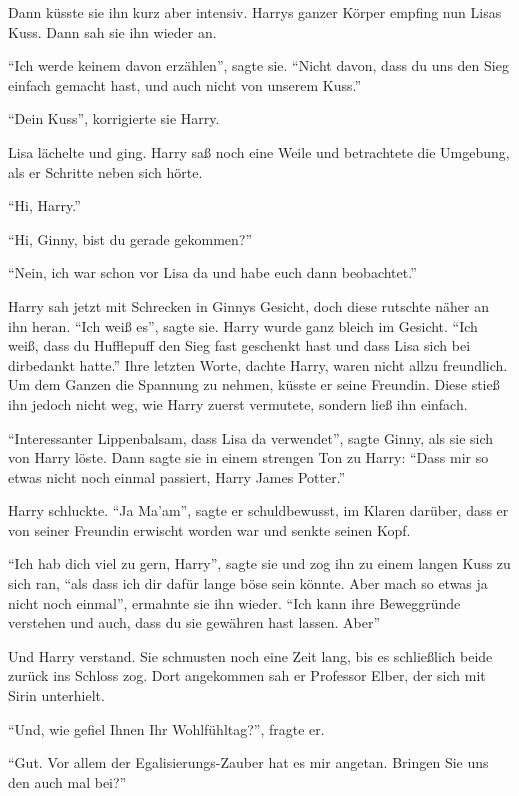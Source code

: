 Dann küsste sie ihn kurz aber intensiv. Harrys ganzer Körper empfing nun Lisas Kuss. Dann sah sie ihn wieder an.

\enquote{Ich werde keinem davon erzählen}, sagte sie. \enquote{Nicht davon, dass du uns den Sieg einfach gemacht hast, und auch nicht von unserem Kuss.}

\enquote{Dein Kuss}, korrigierte sie Harry.

Lisa lächelte und ging. Harry saß noch eine Weile und betrachtete die Umgebung, als er Schritte neben sich hörte.

\enquote{Hi, Harry.}

\enquote{Hi, Ginny, bist du gerade gekommen?}

\enquote{Nein, ich war schon vor Lisa da und habe euch dann beobachtet.}

Harry sah jetzt mit Schrecken in Ginnys Gesicht, doch diese rutschte näher an ihn heran. \enquote{Ich weiß es}, sagte sie. Harry wurde ganz bleich im Gesicht. \enquote{Ich weiß, dass du Hufflepuff den Sieg fast geschenkt hast und dass Lisa sich bei dir\abs bedankt hatte.} Ihre letzten Worte, dachte Harry, waren nicht allzu freundlich. Um dem Ganzen die Spannung zu nehmen, küsste er seine Freundin. Diese stieß ihn jedoch nicht weg, wie Harry zuerst vermutete, sondern ließ ihn einfach.

\enquote{Interessanter Lippenbalsam, dass Lisa da verwendet}, sagte Ginny, als sie sich von Harry löste. Dann sagte sie in einem strengen Ton zu Harry: \enquote{Dass mir so etwas nicht noch einmal passiert, Harry James Potter.}

Harry schluckte. \enquote{Ja Ma'am}, sagte er schuldbewusst, im Klaren darüber, dass er von seiner Freundin erwischt worden war und senkte seinen Kopf.

\enquote{Ich hab dich viel zu gern, Harry}, sagte sie und zog ihn zu einem langen Kuss zu sich ran, \enquote{als dass ich dir dafür lange böse sein könnte. Aber mach so etwas ja nicht noch einmal}, ermahnte sie ihn wieder. \enquote{Ich kann ihre Beweggründe verstehen und auch, dass du sie gewähren hast lassen. Aber\abs}

Und Harry verstand. Sie schmusten noch eine Zeit lang, bis es schließlich beide zurück ins Schloss zog. Dort angekommen sah er Professor Elber, der sich mit Sirin unterhielt.

\enquote{Und, wie gefiel Ihnen Ihr Wohlfühltag?}, fragte er.

\enquote{Gut. Vor allem der Egalisierungs-Zauber hat es mir angetan. Bringen Sie uns den auch mal bei?}


